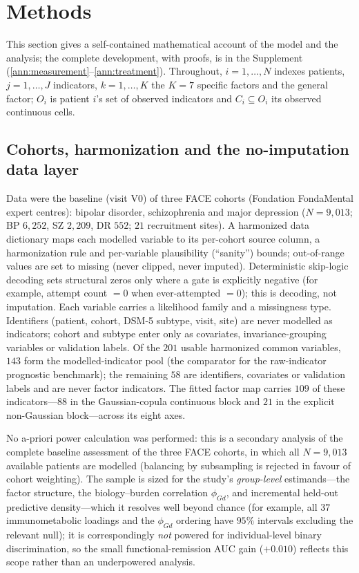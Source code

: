 \section{Methods}

This section gives a self-contained mathematical account of the model and the analysis; the
complete development, with proofs, is in the Supplement
(\ref{ann:measurement}--\ref{ann:treatment}). Throughout, $i=1,\dots,N$ indexes patients,
$j=1,\dots,J$ indicators, $k=1,\dots,K$ the $K=7$ specific factors and \Gfac{} the general
factor; $O_i$ is patient $i$'s set of observed indicators and $C_i\subseteq O_i$ its observed
continuous cells.

\subsection{Cohorts, harmonization and the no-imputation data layer}

Data were the baseline (visit V0) of three FACE cohorts (Fondation FondaMental expert
centres): bipolar disorder, schizophrenia and major depression ($N=9{,}013$; BP
$6{,}252$, SZ $2{,}209$, DR $552$; $21$ recruitment sites). A harmonized data
dictionary maps each modelled variable to its per-cohort source column, a
harmonization rule and per-variable plausibility (``sanity'') bounds; out-of-range
values are set to missing (never clipped, never imputed). Deterministic skip-logic
decoding sets structural zeros only where a gate is explicitly negative (for example,
attempt count $=0$ when ever-attempted $=0$); this is decoding, not imputation. Each
variable carries a likelihood family and a missingness type. Identifiers (patient,
cohort, DSM-5 subtype, visit, site) are never modelled as indicators; cohort and
subtype enter only as covariates, invariance-grouping variables or validation labels.
Of the $201$ usable harmonized common variables, $143$ form the modelled-indicator pool
(the comparator for the raw-indicator prognostic benchmark); the remaining $58$ are
identifiers, covariates or validation labels and are never factor indicators. The fitted
factor map carries $109$ of these indicators---$88$ in the Gaussian-copula continuous
block and $21$ in the explicit non-Gaussian block---across its eight axes.

No a-priori power calculation was performed: this is a secondary analysis of the complete
baseline assessment of the three FACE cohorts, in which all $N=9{,}013$ available patients are
modelled (balancing by subsampling is rejected in favour of cohort weighting). The sample is
sized for the study's \emph{group-level} estimands---the factor structure, the biology--burden
correlation $\phi_{Gd}$, and incremental held-out predictive density---which it resolves well
beyond chance (for example, all $37$ immunometabolic loadings and the $\phi_{Gd}$ ordering have
$95\%$ intervals excluding the relevant null); it is correspondingly \emph{not} powered for
individual-level binary discrimination, so the small functional-remission AUC gain ($+0.010$)
reflects this scope rather than an underpowered analysis.

